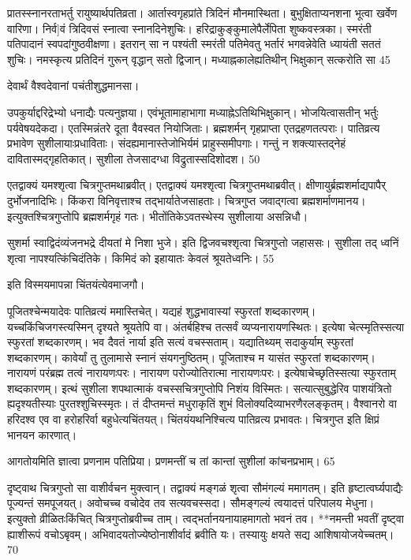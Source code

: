 प्रातस्स्नानरताभर्तु रायुष्यार्थपतिव्रता।
आर्तास्वगृहप्रांते त्रिदिनं मौनमास्थिता।
बुभुक्षिताप्यनशना भूत्वा खर्वेण वारिणा।
निर्व]वं त्रिदिवसं स्नात्वा स्नानदिनेशुचिः।
हरिद्राकुङ्कुमालेपैर्लेपिता शुष्कवस्त्रका।
स्मरंती पतिपादानं स्वपदांगुष्ठवीक्षणा।
इतरान् सा न पश्यंती स्मरंती पतिमेवतु भर्तारं भगवन्नेवेति ध्यायंती सततं शुचिः।
नमस्कृत्य प्रतिदिनं गुरून् वृद्धान् सतो द्विजान्।
मध्याह्नकालेह्यतिथीन् भिक्षुकान् सत्करोति सा 45

देवार्थं वैश्वदेवानां पचंतीशुद्धमानसा।

उपकुर्याद्दरिद्रेभ्यो धनाद्यैः पत्यनुज्ञया।
एवंभूतामाहाभागा मध्याह्नेऽतिथिभिक्षुकान्।
भोजयित्वासतीन् भर्तुः पर्यवेषयदेकदा।
एतस्मिन्नंतरे दूता वैवस्वत नियोजिताः।
ब्रह्मशर्मन् गृहप्राप्ता एतद्रहणतत्पराः।
पातिव्रत्य प्रभावेण सुशीलायाःप्रधाविताः।
संदह्यमानास्तेजोभिर्यमं प्राहुस्समीपगाः।
गन्तुं न शक्त्यास्तद्नेहं दावितास्मद्गृहतिकात्।
सुशीला तेजसादग्धा विद्रुतास्सदिशोदश।
50

एतद्वाक्यं यमश्शृत्वा चित्रगुप्तमथाब्रवीत्।
एतद्वाक्यं यमश्शृत्वा चित्रगुप्तमथाब्रवीत्।
क्षीणायुर्ब्रह्मशर्माद्यपापैर् दुर्भोजनादिभिः।
किंकरा विनिवृत्ताश्च तद्भार्यातेजसाहताः।
चित्रगुप्त जवाद्गत्वा ब्रह्मशर्माणमानय।
इत्युक्तश्चित्रगुप्तोपि ब्रह्मशर्मगृहं गतः।
भीतोंतिकेऽवतस्थेस्य सुशीलाया असन्निधौ।

सुशर्मा
स्वाद्विदंव्यंजनभद्रे दीयतां मे निशा भुजे।
इति द्विजवचश्शृत्वा चित्रगुप्तो जहाससः।
सुशीला तद् ध्वनिं शृत्वा नापश्यत्किंचिदंतिके।
किमिदं को इहायातः केवलं श्रूयतेध्वनिः।
55

इति विस्मयमापन्ना चिंतयंत्येवमाजगौ।

पूजितश्चेन्मयादेवः पातिव्रत्यं ममास्तिचेत्।
यद्यहं शुद्धभावास्यां स्फुरतां शब्दकारणम्।
यच्चकिंचिजगस्त्यस्मिन् दृश्यते श्रूयतेपि वा।
अंतर्बहिश्च तत्सर्वं व्यप्यनारायणस्थितः।
इत्येषा चेत्स्मृतिस्सत्या स्फुरतां शब्दकारणम्।
भव दैवतं नार्या इति सत्यं वचस्सताम्।
यद्यातिथ्यम् सदाकुर्याम् स्फुरतां शब्दकारणम्।
कावेर्यां तु तुलामासे स्नानं संयगनुष्ठितम्।
पूजिताश्च म यासंत स्फुरतां शब्दकारणम्।
नारायणं परंब्रह्म तत्वं नारायणःपरः।
नारायण परोज्योतिरात्मा नारायणःपरः।
इत्येषाचेच्छृतिस्सत्या स्फुरताम् शब्दकारणम्।
इत्थं सुशीला शपथात्माकं
वचस्सचित्रगुप्तोपि निशंय विस्मितः।
सत्यात्सुबुद्धेरिव पाशयंत्रितो
ह्यदृश्यतीस्याः पुरतश्शुचिस्स्मृतः।
तं दीप्तमन्तं मधुराकृतिं
शुभं विलोक्यदिव्याभरणैरलङ्कृतम्।
वैश्वानरो वा हरिदश्व एव वा
हरोहरिर्वा बहुधेत्यचिंतयत्।
चिंतयंयथनिश्चित्य पातिव्रत्य प्रभावतः।
चित्रगुप्त इति क्षिप्रं भानयन कारणात्।

आगतोयमिति ज्ञात्वा प्रणनाम पतिप्रिया।
प्रणमन्तीं च तां कान्तां सुशीलां कांचनप्रभाम्।
65

दृष्ट्वाथ चित्रगुप्तो सा वाशीर्वचन मुक्त्वान्।
तद्वाक्यं मङ्गळं शृत्वा सौमंगल्यं ममागतम्।
इति हृष्टात्वर्घ्यपाद्यैः पूज्यन्तं समपूजयत्।
अवोचच्च वचोदेव तव सत्यवचस्सदा।
सौमङ्गल्यं त्वयादत्तं परिपालय मेधुना।
इत्युक्तो व्रीळितःकिंचित् चित्रगुप्तोब्रवीच्च ताम्।
त्वद्भर्तानयनायाहमागतो भवनं तव।
**नमन्ती भवतीं दृष्ट्वा ह्याशीरूपं वचोऽबृवम्।
अभिवादयतोज्येष्ठोनाशीर्वादं ब्रवीति यः।
तस्यायुः क्षयते सद्य आशिषायोजयेच्चतम्।
70

